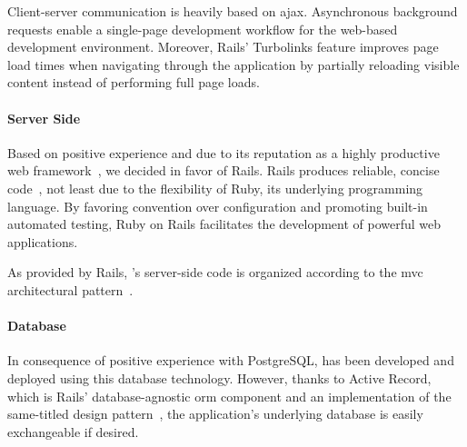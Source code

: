 Client-server communication is heavily based on \gls{ajax}. Asynchronous background requests enable a single-page development workflow for the web-based development environment. Moreover, Rails' Turbolinks feature improves page load times when navigating through the application by partially reloading visible content instead of performing full page loads.

\paragraph{Server Side}

Based on positive experience and due to its reputation as a highly productive web framework~\cite{fox2012crossing}, we decided in favor of Rails. Rails produces reliable, concise code~\cite{geer2006will}, not least due to the flexibility of Ruby, its underlying programming language. By favoring convention over configuration and promoting built-in automated testing, Ruby on Rails facilitates the development of powerful web applications.

As provided by Rails, \tool's server-side code is organized according to the \gls{mvc} architectural pattern~\cite{krasner1988description}.

\paragraph{Database}

In consequence of positive experience with PostgreSQL, \tool has been developed and deployed using this database technology. However, thanks to Active Record, which is Rails' database-agnostic \gls{orm} component and an implementation of the same-titled design pattern~\cite{fowler2002patterns}, the application's underlying database is easily exchangeable if desired.
